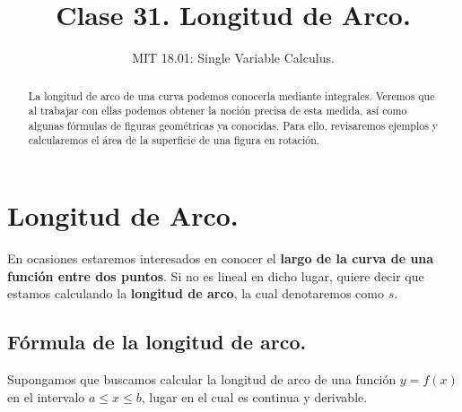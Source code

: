 \documentclass[12pt]{article}
\title{Clase 31. Longitud de Arco.}
\author{MIT 18.01: Single Variable Calculus.}
\date{}
\begin{document}
\maketitle

\begin{abstract}
\noindent La longitud de arco de una curva podemos conocerla mediante integrales. Veremos que al trabajar con ellas podemos obtener la noción precisa de esta medida, así como algunas fórmulas de figuras geométricas ya conocidas. Para ello, revisaremos ejemplos y calcularemos el área de la superficie de una figura en rotación.
\end{abstract}


\section{Longitud de Arco.}

En ocasiones estaremos interesados en conocer el \textbf{largo de la curva de una función entre dos puntos}. Si no es lineal en dicho lugar, quiere decir que estamos calculando la \textbf{longitud de arco}, la cual denotaremos como $s$.

\subsection{Fórmula de la longitud de arco.}

Supongamos que buscamos calcular la longitud de arco de una función $y = f(x)$ en el intervalo $a \leq x \leq b$, lugar en el cual es continua y derivable.

\begin{figure}[hbt!]
\centering


\end{figure}
\end{document}
